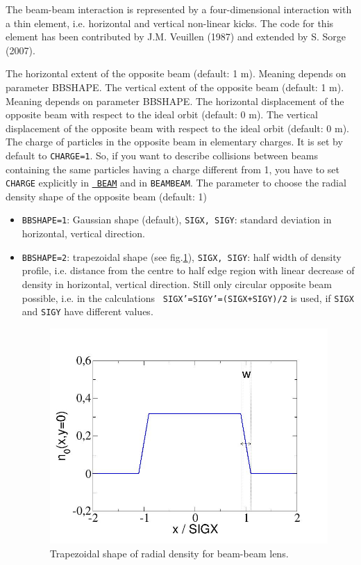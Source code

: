 {The beam-beam interaction is represented by a four-dimensional
interaction with a thin element, i.e. horizontal and vertical non-linear kicks.
The code for this element has been contributed by J.M. Veuillen (1987)
and extended by S. Sorge (2007).  
 
\begin{madlist}
     The horizontal extent of the opposite beam (default: 1 m).
     Meaning depends on parameter BBSHAPE.
     The vertical extent of the opposite beam (default: 1 m).
     Meaning depends on parameter BBSHAPE.
     The horizontal displacement of the opposite beam with respect to
     the ideal orbit (default: 0 m).
     The vertical displacement of the opposite beam with respect to
     the ideal orbit (default: 0 m).
     The charge of particles in the opposite beam in elementary charges. 
     It is set by default to {\tt CHARGE=1}. So, if you want to describe 
     collisions 
     between beams containing the same particles having a charge different 
     from 1, you have to set {\tt CHARGE} explicitly in \hyperref[sec:beam]{\tt 
     BEAM} and in {\tt BEAMBEAM}. 
    The parameter to choose the radial density shape of the 
     opposite beam (default: 1)
     \begin{itemize}
       \item  {\tt BBSHAPE=1}: Gaussian shape (default), {\tt SIGX, SIGY}: 
       standard deviation in horizontal, vertical direction.
       \item  {\tt BBSHAPE=2}: trapezoidal shape (see 
       fig.\ref{fig:beambeam_n_trapez}), {\tt SIGX, SIGY}: half width of 
       density profile, i.e. distance from the centre to half edge region with 
       linear decrease of density in horizontal, vertical direction. Still only 
       circular opposite beam possible, i.e. in the calculations {\tt 
       SIGX'=SIGY'=(SIGX+SIGY)/2} is used, if {\tt SIGX} and {\tt SIGY} have 
       different values.

\begin{figure}[h]
  \begin{center}
    \includegraphics[width=400px]{jpg/beambeam_n_trapez.jpg}
    \caption{Trapezoidal shape of radial density for beam-beam lens.} 
    \label{fig:beambeam_n_trapez}
  \end{center}
\end{figure}


\end{itemize}
\end{madlist}}
